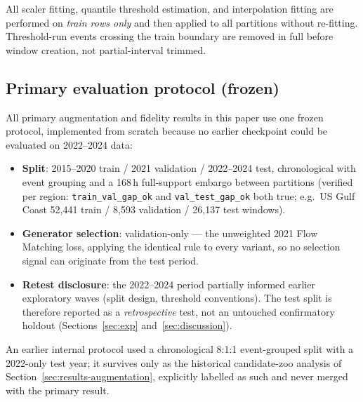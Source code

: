 All scaler fitting, quantile threshold estimation, and interpolation fitting are
performed on \emph{train rows only} and then applied to all partitions without
re-fitting. Threshold-run events crossing the train boundary are removed in full
before window creation, not partial-interval trimmed.

\subsection{Primary evaluation protocol (frozen)}
\label{subsec:primary-protocol}
All primary augmentation and fidelity results in this paper use one frozen
protocol, implemented from scratch because no earlier checkpoint could be
evaluated on 2022--2024 data:

\begin{itemize}
    \item \textbf{Split}: 2015--2020 train / 2021 validation / 2022--2024 test,
    chronological with event grouping and a 168\,h full-support embargo
    between partitions (verified per region: \texttt{train\_val\_gap\_ok} and
    \texttt{val\_test\_gap\_ok} both true; e.g.\ US Gulf Coast 52{,}441 train
    / 8{,}593 validation / 26{,}137 test windows).
    \item \textbf{Generator selection}: validation-only --- the unweighted
    2021 Flow Matching loss, applying the identical rule to every variant, so
    no selection signal can originate from the test period.
    \item \textbf{Retest disclosure}: the 2022--2024 period partially informed
    earlier exploratory waves (split design, threshold conventions). The test
    split is therefore reported as a \emph{retrospective} test, not an
    untouched confirmatory holdout (Sections~\ref{sec:exp}
    and~\ref{sec:discussion}).
\end{itemize}

An earlier internal protocol used a chronological 8:1:1 event-grouped split
with a 2022-only test year; it survives only as the historical candidate-zoo
analysis of Section~\ref{sec:results-augmentation}, explicitly labelled as
such and never merged with the primary result.

